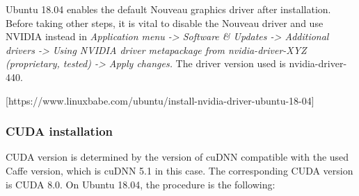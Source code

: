 Ubuntu 18.04 enables the default Nouveau graphics driver after installation. Before taking other steps, it is vital to disable the Nouveau driver and use NVIDIA instead in \textit{Application menu -> Software \& Updates -> Additional drivers
	-> Using NVIDIA driver metapackage from nvidia-driver-XYZ (proprietary, tested) -> Apply changes.} The driver version used is nvidia-driver-440.

[https://www.linuxbabe.com/ubuntu/install-nvidia-driver-ubuntu-18-04]

\subsubsection{CUDA installation}

CUDA version is determined by the version of cuDNN compatible with the used Caffe version, which is cuDNN 5.1 in this case. The corresponding CUDA version is CUDA 8.0. On Ubuntu 18.04, the procedure is the following:

